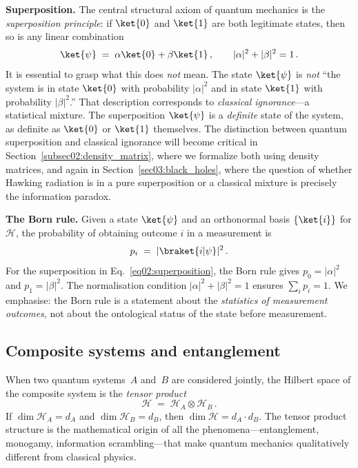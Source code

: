 \documentclass[11pt,letterpaper]{article}
\theoremstyle{plain}
\theoremstyle{definition}
\theoremstyle{remark}
\newcommand{\Hcal}{\mathcal{H}}
\begin{document}
\medskip
\noindent\textbf{Superposition.}
The central structural axiom of quantum mechanics is the \emph{superposition principle}:
if $\ket{0}$ and $\ket{1}$ are both legitimate states, then so is any linear combination
\begin{equation}\label{eq02:superposition}
  \ket{\psi} \;=\; \alpha\ket{0} + \beta\ket{1}\,,
  \qquad |\alpha|^2 + |\beta|^2 = 1\,.
\end{equation}
It is essential to grasp what this does \emph{not} mean.  The state $\ket{\psi}$ is
\emph{not} ``the system is in state $\ket{0}$ with probability $|\alpha|^2$ and in state
$\ket{1}$ with probability $|\beta|^2$.''  That description corresponds to \emph{classical
ignorance}---a statistical mixture.  The superposition $\ket{\psi}$ is a \emph{definite}
state of the system, as definite as $\ket{0}$ or $\ket{1}$ themselves.  The distinction
between quantum superposition and classical ignorance will become critical in
Section~\ref{subsec02:density_matrix}, where we formalize both using density matrices, and
again in Section~\ref{sec03:black_holes}, where the question of whether Hawking radiation
is in a pure superposition or a classical mixture is precisely the information paradox.

\medskip
\noindent\textbf{The Born rule.}
Given a state $\ket{\psi}$ and an orthonormal basis $\{\ket{i}\}$ for $\Hcal$, the
probability of obtaining outcome $i$ in a measurement is
\begin{equation}\label{eq02:born_rule}
  p_i \;=\; |\braket{i|\psi}|^2\,.
\end{equation}
For the superposition in Eq.~\eqref{eq02:superposition}, the Born rule gives
$p_0 = |\alpha|^2$ and $p_1 = |\beta|^2$.  The normalisation condition
$|\alpha|^2+|\beta|^2=1$ ensures $\sum_i p_i = 1$.  We emphasise: the Born rule
is a statement about the \emph{statistics of measurement outcomes}, not about the
ontological status of the state before measurement.

\subsection{Composite systems and entanglement}
\label{subsec02:entanglement}

When two quantum systems~$A$ and~$B$ are considered jointly, the Hilbert space of the
composite system is the \emph{tensor product}
\begin{equation}\label{eq02:tensor_product}
  \Hcal \;=\; \Hcal_A \otimes \Hcal_B\,.
\end{equation}
If $\dim\Hcal_A = d_A$ and $\dim\Hcal_B = d_B$, then $\dim\Hcal = d_A \cdot d_B$.
The tensor product structure is the mathematical origin of all the phenomena---entanglement,
monogamy, information scrambling---that make quantum mechanics qualitatively different from
classical physics.
\end{document}
